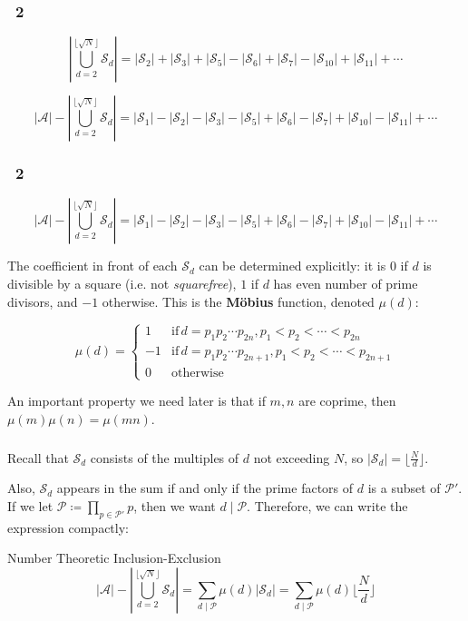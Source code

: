 
\begin{frame}\frametitle{\insertsubsection \, 2}
\[
  \left|\bigcup_{d = 2}^{\lfloor\sqrt{N}\rfloor} \mathcal{S}_d\right|
  = |\mathcal{S}_2| + |\mathcal{S}_3| + |\mathcal{S}_5| - |\mathcal{S}_6| + |\mathcal{S}_7| - |\mathcal{S}_{10}| + |\mathcal{S}_{11}| + \cdots
\]

\[
  |\mathcal{A}| - \left|\bigcup_{d = 2}^{\lfloor\sqrt{N}\rfloor} \mathcal{S}_d\right|
  = |\mathcal{S}_1| - |\mathcal{S}_2| - |\mathcal{S}_3| - |\mathcal{S}_5| + |\mathcal{S}_6| - |\mathcal{S}_7| + |\mathcal{S}_{10}| - |\mathcal{S}_{11}| + \cdots
\]
\end{frame}

\begin{frame}\frametitle{\insertsubsection \, 2}
\[
  |\mathcal{A}| - \left|\bigcup_{d = 2}^{\lfloor\sqrt{N}\rfloor} \mathcal{S}_d\right|
  = |\mathcal{S}_1| - |\mathcal{S}_2| - |\mathcal{S}_3| - |\mathcal{S}_5| + |\mathcal{S}_6| - |\mathcal{S}_7| + |\mathcal{S}_{10}| - |\mathcal{S}_{11}| + \cdots
\]

The coefficient in front of each \(\mathcal{S}_d\) can be determined explicitly: it is \(0\) if \(d\) is divisible by a square (i.e. not \textit{squarefree}), \(1\) if \(d\) has even number of prime divisors, and \(-1\) otherwise. This is the \textbf{Möbius} function, denoted \(\mu(d)\):

\[
  \mu(d) = \begin{cases}
    1 &\text{if} \, d = p_1p_2\cdots p_{2n}, p_1 < p_2 < \cdots < p_{2n} \\
    -1 &\text{if} \, d = p_1p_2\cdots p_{2n + 1}, p_1 < p_2 < \cdots < p_{2n + 1} \\
    0 &\text{otherwise}
  \end{cases}
\]

An important property we need later is that if \(m, n\) are coprime, then \(\mu(m)\mu(n) = \mu(mn)\).
\end{frame}

\begin{frame}\frametitle{\insertsubsection}

Recall that \(\mathcal{S}_d\) consists of the multiples of \(d\) not exceeding \(N\), so \(|\mathcal{S}_d| = \lfloor\frac{N}{d}\rfloor\).

Also, \(\mathcal{S}_d\) appears in the sum if and only if the prime factors of \(d\) is a subset of \(\mathcal{P}'\). If we let \(\mathscr{P} \coloneqq \prod_{p \in \mathcal{P}'} p\), then we want \(d \mid \mathscr{P}\). Therefore, we can write the expression compactly:

\begin{block}{Number Theoretic Inclusion-Exclusion}
\[
  |\mathcal{A}| - \left|\bigcup_{d = 2}^{\lfloor\sqrt{N}\rfloor} \mathcal{S}_d\right| = \sum_{d \mid \mathscr{P}} \mu(d)|\mathcal{S}_d| = \sum_{d \mid \mathscr{P}} \mu(d)\lfloor\frac{N}{d}\rfloor
\]
\end{block}
\end{frame}
